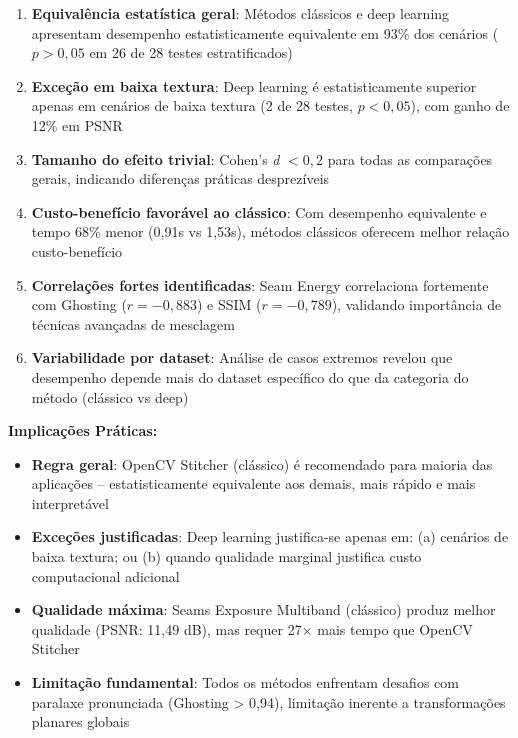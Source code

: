 \begin{enumerate}
    \item \textbf{Equivalência estatística geral}: Métodos clássicos e deep learning apresentam desempenho estatisticamente equivalente em 93\% dos cenários ($p>0{,}05$ em 26 de 28 testes estratificados)

    \item \textbf{Exceção em baixa textura}: Deep learning é estatisticamente superior apenas em cenários de baixa textura (2 de 28 testes, $p<0{,}05$), com ganho de 12\% em PSNR

    \item \textbf{Tamanho do efeito trivial}: Cohen's \textit{d} $<0{,}2$ para todas as comparações gerais, indicando diferenças práticas desprezíveis

    \item \textbf{Custo-benefício favorável ao clássico}: Com desempenho equivalente e tempo 68\% menor (0,91s vs 1,53s), métodos clássicos oferecem melhor relação custo-benefício

    \item \textbf{Correlações fortes identificadas}: Seam Energy correlaciona fortemente com Ghosting ($r=-0{,}883$) e SSIM ($r=-0{,}789$), validando importância de técnicas avançadas de mesclagem

    \item \textbf{Variabilidade por dataset}: Análise de casos extremos revelou que desempenho depende mais do dataset específico do que da categoria do método (clássico vs deep)
\end{enumerate}

\textbf{Implicações Práticas:}

\begin{itemize}
    \item \textbf{Regra geral}: OpenCV Stitcher (clássico) é recomendado para maioria das aplicações -- estatisticamente equivalente aos demais, mais rápido e mais interpretável

    \item \textbf{Exceções justificadas}: Deep learning justifica-se apenas em: (a) cenários de baixa textura; ou (b) quando qualidade marginal justifica custo computacional adicional

    \item \textbf{Qualidade máxima}: Seams Exposure Multiband (clássico) produz melhor qualidade (PSNR: 11,49 dB), mas requer 27× mais tempo que OpenCV Stitcher

    \item \textbf{Limitação fundamental}: Todos os métodos enfrentam desafios com paralaxe pronunciada (Ghosting > 0,94), limitação inerente a transformações planares globais
\end{itemize}

